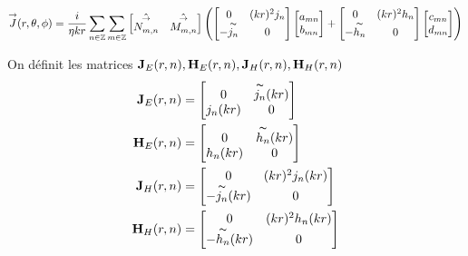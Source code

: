         \begin{equation}
            {\overset{\rightarrow}{J}}(r,\theta,\phi) = \dfrac{i}{\eta kr}\sum_{n\in\mathbb Z}\sum_{m\in\mathbb Z}
            \begin{bmatrix}
                \hat{{\overset{\rightarrow}{N_{m,n}^{{}}}}} & \hat{{\overset{\rightarrow}{M_{m,n}^{{}}}}}
            \end{bmatrix}
            \left( 
                \begin{bmatrix}
                    0 & (kr)^2 j_n
                    \\
                    -\overset{\thicksim}{j_n} & 0
                \end{bmatrix}
                \begin{bmatrix}
                    a_{mn}
                    \\
                    b_{mn}
                \end{bmatrix}
                + 
                \begin{bmatrix}
                    0 & (kr)^2 h_n
                    \\
                    -\overset{\thicksim}{h_n} & 0
                \end{bmatrix}
                \begin{bmatrix}
                    c_{mn}
                    \\
                    d_{mn}
                \end{bmatrix}
            \right)
        \end{equation}

        \begin{defn}
            On définit les matrices \(\mathbf{J}_{E}(r,n),\mathbf{H}_{E}(r,n),\mathbf{J}_{H}(r,n),\mathbf{H}_{H}(r,n)\)
            \begin{align}
                \mathbf{J}_{E}(r,n) &=
                \begin{bmatrix}
                    0 & \overset{\thicksim}{j_n}(kr)
                    \\
                    j_n(kr) & 0
                \end{bmatrix}
                \\
                \mathbf{H}_{E}(r,n) &=
                \begin{bmatrix}
                    0 & \overset{\thicksim}{h_n}(kr)
                    \\
                    h_n(kr) & 0
                \end{bmatrix}
                \\
                \mathbf{J}_{H}(r,n) &=
                \begin{bmatrix}
                    0 & (kr)^2 j_n(kr)
                    \\
                    -\overset{\thicksim}{j_n}(kr) & 0
                \end{bmatrix}
                \\
                \mathbf{H}_{H}(r,n) &=
                \begin{bmatrix}
                    0 & (kr)^2 h_n(kr)
                    \\
                    -\overset{\thicksim}{h_n}(kr) & 0
                \end{bmatrix}
            \end{align}
        \end{defn}

